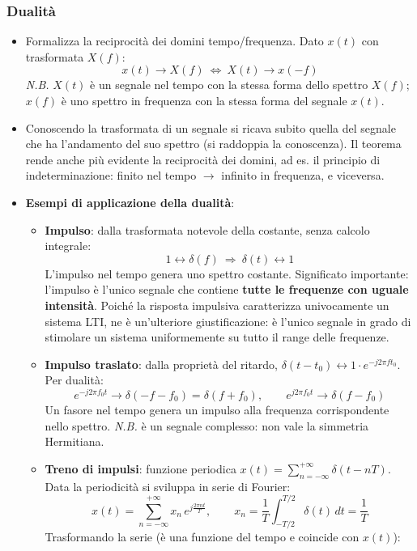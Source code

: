 \documentclass[12pt, a4paper]{article}
\begin{document}
\subsubsection{Dualità}
\begin{itemize}
    \item Formalizza la reciprocità dei domini tempo/frequenza. Dato $x(t)$ con trasformata $X(f)$:
    $$x(t)\longrightarrow X(f)\ \Longleftrightarrow\ X(t)\longrightarrow x(-f)$$
    \textit{N.B.} $X(t)$ è un segnale nel tempo con la stessa forma dello spettro $X(f)$; $x(f)$ è uno spettro in frequenza con la stessa forma del segnale $x(t)$.
    \item Conoscendo la trasformata di un segnale si ricava subito quella del segnale che ha l'andamento del suo spettro (si raddoppia la conoscenza). Il teorema rende anche più evidente la reciprocità dei domini, ad es. il principio di indeterminazione: finito nel tempo $\to$ infinito in frequenza, e viceversa.
    \item \textbf{Esempi di applicazione della dualità}:
    \begin{itemize}
        \item \textbf{Impulso}: dalla trasformata notevole della costante, senza calcolo integrale:
        $$1\longleftrightarrow\delta(f)\ \Longrightarrow\ \delta(t)\longleftrightarrow1$$
        L'impulso nel tempo genera uno spettro costante. Significato importante: l'impulso è l'unico segnale che contiene \textbf{tutte le frequenze con uguale intensità}. Poiché la risposta impulsiva caratterizza univocamente un sistema LTI, ne è un'ulteriore giustificazione: è l'unico segnale in grado di stimolare un sistema uniformemente su tutto il range delle frequenze.
        \item \textbf{Impulso traslato}: dalla proprietà del ritardo, $\delta(t-t_0)\longleftrightarrow1\cdot e^{-j2\pi ft_0}$. Per dualità:
        $$e^{-j2\pi f_0t}\longrightarrow\delta(-f-f_0)=\delta(f+f_0),\qquad e^{j2\pi f_0t}\longrightarrow\delta(f-f_0)$$
        Un fasore nel tempo genera un impulso alla frequenza corrispondente nello spettro. \textit{N.B.} è un segnale complesso: non vale la simmetria Hermitiana.
        \item \textbf{Treno di impulsi}: funzione periodica $x(t)=\sum_{n=-\infty}^{+\infty}\delta(t-nT)$. Data la periodicità si sviluppa in serie di Fourier:
        $$x(t)=\sum_{n=-\infty}^{+\infty}x_n\,e^{j\frac{2\pi nt}{T}},\qquad x_n=\frac1T\int_{-T/2}^{T/2}\delta(t)\,dt=\frac1T$$
        Trasformando la serie (è una funzione del tempo e coincide con $x(t)$):

\end{itemize}
\end{itemize}
\end{document}
